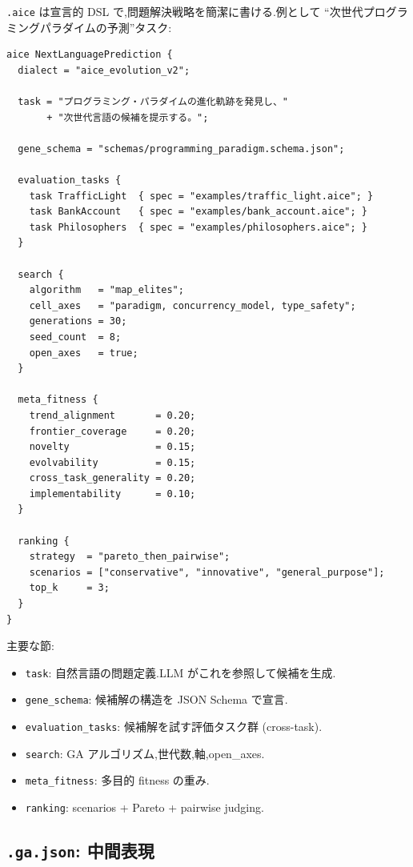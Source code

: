 \documentclass[11pt,a4paper]{article}
\newcommand{\code}[1]{\texttt{\small #1}}
\begin{document}
\code{.aice} は宣言的 DSL で,問題解決戦略を簡潔に書ける.例として
``次世代プログラミングパラダイムの予測''タスク:

\begin{lstlisting}[language=aice]
aice NextLanguagePrediction {
  dialect = "aice_evolution_v2";

  task = "プログラミング・パラダイムの進化軌跡を発見し、"
       + "次世代言語の候補を提示する。";

  gene_schema = "schemas/programming_paradigm.schema.json";

  evaluation_tasks {
    task TrafficLight  { spec = "examples/traffic_light.aice"; }
    task BankAccount   { spec = "examples/bank_account.aice"; }
    task Philosophers  { spec = "examples/philosophers.aice"; }
  }

  search {
    algorithm   = "map_elites";
    cell_axes   = "paradigm, concurrency_model, type_safety";
    generations = 30;
    seed_count  = 8;
    open_axes   = true;
  }

  meta_fitness {
    trend_alignment       = 0.20;
    frontier_coverage     = 0.20;
    novelty               = 0.15;
    evolvability          = 0.15;
    cross_task_generality = 0.20;
    implementability      = 0.10;
  }

  ranking {
    strategy  = "pareto_then_pairwise";
    scenarios = ["conservative", "innovative", "general_purpose"];
    top_k     = 3;
  }
}
\end{lstlisting}

主要な節:

\begin{itemize}[leftmargin=*,itemsep=0pt]
  \item \code{task}: 自然言語の問題定義.LLM がこれを参照して候補を生成.
  \item \code{gene\_schema}: 候補解の構造を JSON Schema で宣言.
  \item \code{evaluation\_tasks}: 候補解を試す評価タスク群 (cross-task).
  \item \code{search}: GA アルゴリズム,世代数,軸,open\_axes.
  \item \code{meta\_fitness}: 多目的 fitness の重み.
  \item \code{ranking}: scenarios + Pareto + pairwise judging.
\end{itemize}

\subsection{\code{.ga.json}: 中間表現}
\end{document}
